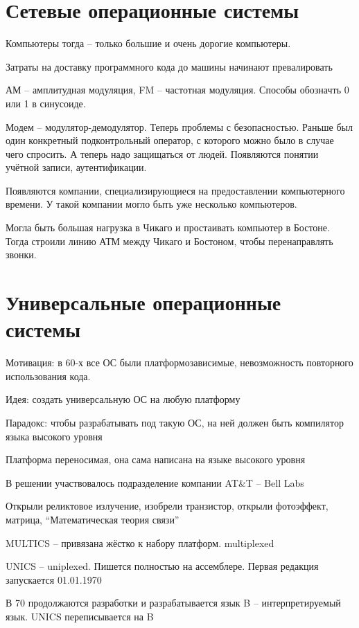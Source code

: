 \documentclass{book}
\theoremstyle{definition}
\begin{document}
    \section{Сетевые операционные системы}

    Компьютеры тогда -- только большие и очень дорогие компьютеры.

    Затраты на доставку программного кода до машины начинают превалировать

    АМ -- амплитудная модуляция, FM -- частотная модуляция. Способы обозначть 0 или 1 в синусоиде.

    Модем -- модулятор-демодулятор. Теперь проблемы с безопасностью. Раньше был один конкретный подконтрольный оператор, с которого можно было в случае чего спросить. А теперь надо защищаться от людей. Появляются понятии учётной записи, аутентификации.

    Появляются компании, специализирующиеся на предоставлении компьютерного времени. У такой компании могло быть уже несколько компьютеров.

    Могла быть большая нагрузка в Чикаго и простаивать компьютер в Бостоне. Тогда строили линию АТМ между Чикаго и Бостоном, чтобы перенаправлять звонки.
    
    \section{Универсальные операционные системы}
  
    Мотивация: в 60-х все ОС были платформозависимые, невозможность повторного использования кода.

    Идея: создать универсальную ОС на любую платформу

    Парадокс: чтобы разрабатывать под такую ОС, на ней должен быть компилятор языка высокого уровня

    Платформа переносимая, она сама написана на языке высокого уровня

    В решении участвовалось подразделение компании AT\&T -- Bell Labs

    Открыли реликтовое излучение, изобрели транзистор, открыли фотоэффект, матрица, ``Математическая теория связи''

    MULTICS -- привязана жёстко к набору платформ. multiplexed

    UNICS -- uniplexed. Пишется полностью на ассемблере. Первая редакция запускается 01.01.1970

    В 70 продолжаются разработки и разрабатывается язык B -- интерпретируемый язык. UNICS переписывается на B
\end{document}
